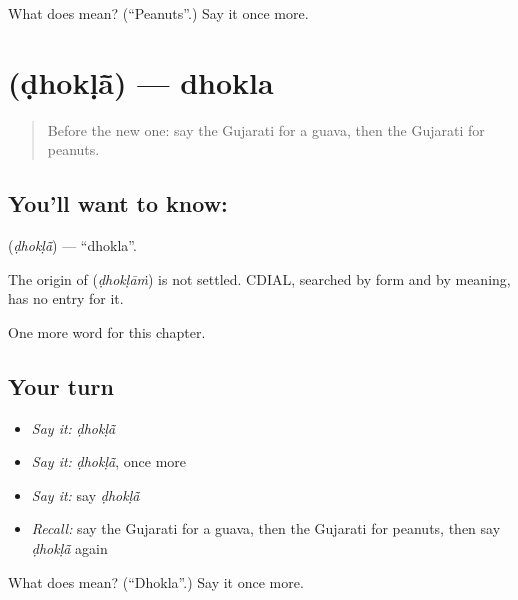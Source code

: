 \begin{tcolorbox}[breakable,colback=teal!4,colframe=teal!35!black,title={Before you move on}]
What does  mean? (\textquotedblleft{}Peanuts\textquotedblright{}.) Say it once more.
\end{tcolorbox}
\section[\texorpdfstring{\gu{ઢોકળાં} (ḍhokḷā̃)}{ઢોકળાં (ḍhokḷā̃)}]{ (ḍhokḷā̃) — dhokla}

\label{lesson:GU-C116-dhokla}



\begin{quote}
Before the new one: say the Gujarati for a guava, then the Gujarati for peanuts.
\end{quote}

\subsection*{You'll want to know: }
\textbf{} (\emph{ḍhokḷā̃}) — \textquotedblleft{}dhokla\textquotedblright{}.

\begin{cousinweb}
The origin of \textbf{} (\emph{ḍhokḷāṁ}) is not settled. CDIAL, searched by form and by meaning, has no entry for it.
\end{cousinweb}

\begin{grammarlens}[title={What you've built}]
One more word for this chapter.
\end{grammarlens}

\subsection*{Your turn}
\begin{itemize}
\raggedright
  \item \emph{Say it:} \emph{ḍhokḷā̃}
  \item \emph{Say it:} \emph{ḍhokḷā̃}, once more
  \item \emph{Say it:} say \emph{ḍhokḷā̃}
  \item \emph{Recall:} say the Gujarati for a guava, then the Gujarati for peanuts, then say \emph{ḍhokḷā̃} again
\end{itemize}

\begin{tcolorbox}[breakable,colback=teal!4,colframe=teal!35!black,title={Before you move on}]
What does  mean? (\textquotedblleft{}Dhokla\textquotedblright{}.) Say it once more.
\end{tcolorbox}
